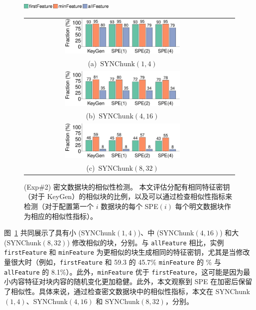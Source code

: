 \begin{figure}[!htb]
    \centering
    \includegraphics[width=0.4\textwidth]{pic/featurespy/plot/detection/syn/synBarPlotDetect_legend.pdf}\\
    \begin{tabular}{@{}c@{}c@{}c}
        \includegraphics[width=0.6\textwidth]{pic/featurespy/plot/detection/syn/syn-p1-q4-detect.pdf} \\
        \mbox{\small (a) $\textrm{SYNChunk}(1, 4)$}\\
        \includegraphics[width=0.6\textwidth]{pic/featurespy/plot/detection/syn/syn-p4-q16-detect.pdf} \\
        \mbox{\small (b) $\textrm{SYNChunk}(4, 16)$}\\
        \includegraphics[width=0.6\textwidth]{pic/featurespy/plot/detection/syn/syn-p8-q32-detect.pdf}\\
        \mbox{\small (c) $\textrm{SYNChunk}(8, 32)$}\\
    \end{tabular}
    \vspace{-6pt}
    \caption{(Exp\#2) 密文数据块的相似性检测。 本文评估分配有相同特征密钥（对于 KeyGen）的相似块的比例，以及可以通过检查相似性指标来检测（对于配置第一个 $i$ 数据块的每个 SPE$(i)$ 每个明文数据块作为相应的相似性指标）。}
    \vspace{-6pt}
    \label{fig:featurespy-expDetectionSynDetect}
\end{figure}

图~\ref{fig:featurespy-expDetectionSynDetect} 共同展示了具有小 (SYNChunk$(1, 4)$)、中 (SYNChunk$(4, 16)$) 和大 (SYNChunk$(8, 32)$) 修改相似的块，分别。与 {\tt allFeature} 相比，实例 {\tt firstFeature} 和 {\tt minFeature} 为更相似的块生成相同的特征密钥，尤其是当修改量很大时（例如，{\tt firstFeature} 和 59.3 的 45.7\% {\tt minFeature} 的 \% 与 {\tt allFeature} 的 8.1\%）。此外，{\tt minFeature} 优于 {\tt firstFeature}，这可能是因为最小内容特征对块内容的随机变化更加稳健。此外，本文观察到 SPE 在加密后保留了相似性。具体来说，通过检查密文数据块中的相似性指标，本文在 SYNChunk$(1, 4)$、SYNChunk$(4, 16)$ 和 SYNChunk$( 8, 32)$，分别。


